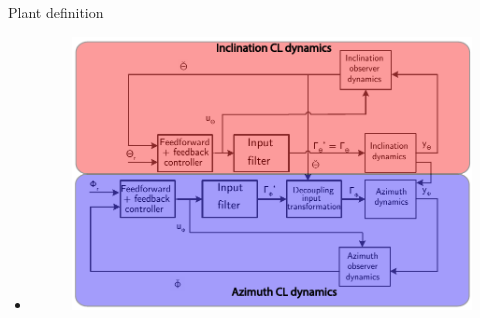 \documentclass{beamer}
\begin{document}
\begin{frame}{Plant definition}
\begin{itemize}
\begin{figure}[ht]
			\end{figure}
			\item <3|only@3> [] \begin{figure}[ht]\centering
				\includegraphics[width=1\textwidth]{images/ControlStrategy0.pdf}
			\end{figure}
\end{itemize}
\end{frame}
\end{document}
